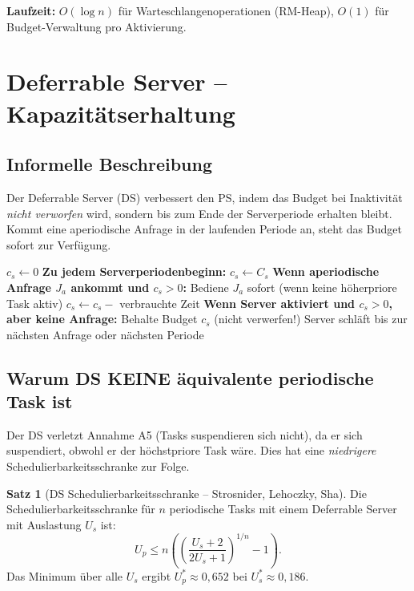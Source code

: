 ﻿\documentclass[a4paper,12pt]{report}
\theoremstyle{definition}
\newtheorem{satz}{Satz}[chapter]
\begin{document}
\textbf{Laufzeit:} $O(\log n)$ für Warteschlangenoperationen (RM-Heap),
$O(1)$ für Budget-Verwaltung pro Aktivierung.

\section{Deferrable Server -- Kapazitätserhaltung}

\subsection{Informelle Beschreibung}

Der Deferrable Server (DS) verbessert den PS, indem das Budget bei Inaktivität
\emph{nicht verworfen} wird, sondern bis zum Ende der Serverperiode erhalten
bleibt. Kommt eine aperiodische Anfrage in der laufenden Periode an, steht
das Budget sofort zur Verfügung.

\begin{algorithm}[H]
	\caption{Deferrable Server}
	\begin{algorithmic}[1]
		\State $c_s \leftarrow 0$ 
		\State
		\State \textbf{Zu jedem Serverperiodenbeginn:}
		\State $c_s \leftarrow C_s$ 
		\State
		\State \textbf{Wenn aperiodische Anfrage $J_a$ ankommt und $c_s > 0$:}
		\State Bediene $J_a$ sofort (wenn keine höherpriore Task aktiv)
		\State $c_s \leftarrow c_s - $ verbrauchte Zeit
		\State
		\State \textbf{Wenn Server aktiviert und $c_s > 0$, aber keine Anfrage:}
		\State Behalte Budget $c_s$ (nicht verwerfen!)
		\State Server schläft bis zur nächsten Anfrage oder nächsten Periode
	\end{algorithmic}
\end{algorithm}

\subsection{Warum DS KEINE äquivalente periodische Task ist}

Der DS verletzt Annahme A5 (Tasks suspendieren sich nicht), da er sich
suspendiert, obwohl er der höchstpriore Task wäre. Dies hat eine \emph{niedrigere}
Schedulierbarkeitsschranke zur Folge.

\begin{satz}[DS Schedulierbarkeitsschranke -- Strosnider, Lehoczky, Sha]
	\label{satz:ds}
	Die Schedulierbarkeitsschranke für $n$ periodische Tasks mit einem
	Deferrable Server mit Auslastung $U_s$ ist:
	\[
		U_p \leq n \left(\left(\frac{U_s+2}{2U_s+1}\right)^{1/n} - 1\right).
	\]
	Das Minimum über alle $U_s$ ergibt $U_p^* \approx 0{,}652$ bei $U_s^* \approx 0{,}186$.
\end{satz}
\end{document}
